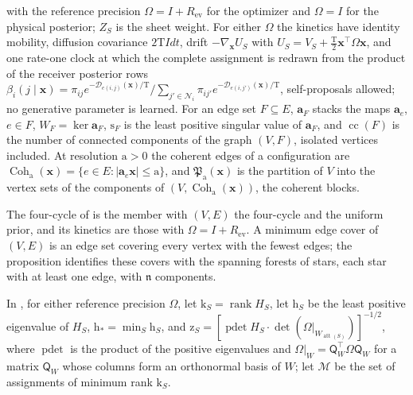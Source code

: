 with the reference precision \(\Omega=I+R_{\mathrm{ev}}\) for the optimizer
and \(\Omega=I\) for the physical posterior; \(Z_S\) is the sheet weight. For
either \(\Omega\) the kinetics have identity mobility, diffusion covariance
\(2\mathrm TI dt\), drift \(-\nabla_{\mathbf x}U_S\) with
\(U_S=V_S+\tfrac{\mathrm T}2\mathbf x^\top\Omega\mathbf x\), and one rate-one
clock at which the complete assignment is redrawn from the product of the
receiver posterior rows
\(\beta_i(j\mid\mathbf x)=\pi_{ij}e^{-\mathcal D_{e(i,j)}(\mathbf x)/\mathrm T}
\big/\allowbreak\sum_{j'\in\mathcal N_i}\pi_{ij'}e^{-\mathcal D_{e(i,j')}(\mathbf x)/\mathrm T}\),
self-proposals allowed; no generative parameter is learned. For an edge set
\(F\subseteq E\), \(\mathbf a_F\) stacks the maps \(\mathbf a_e\), \(e\in F\),
\(W_F=\ker\mathbf a_F\), \(\mathrm s_F\) is the least positive singular value
of \(\mathbf a_F\), and \(\operatorname{cc}(F)\) is the number of connected
components of the graph \((V,F)\), isolated vertices included. At resolution
\(\mathrm a>0\) the coherent edges of a configuration are
\(\operatorname{Coh}_{\mathrm a}(\mathbf x)=\{e\in E:|\mathbf a_e\mathbf x|\le\mathrm a\}\),
and \(\mathfrak P_{\mathrm a}(\mathbf x)\) is the partition of \(V\) into the
vertex sets of the components of \((V,\operatorname{Coh}_{\mathrm a}(\mathbf x))\),
the coherent blocks.

The four-cycle of  is the member with
\((V,E)\) the four-cycle and the uniform prior, and its kinetics are those with
\(\Omega=I+R_{\mathrm{ev}}\). A minimum edge cover of \((V,E)\) is an edge set
covering every vertex with the fewest edges; the proposition identifies these
covers with the spanning forests of stars, each star with at least one edge,
with \(\mathfrak n\) components.

In , for either reference precision
\(\Omega\), let \(\mathrm k_S=\operatorname{rank}H_S\), let \(\mathrm h_S\) be
the least positive eigenvalue of \(H_S\), \(\mathrm h_*=\min_S\mathrm h_S\),
and \(\mathrm z_S=[\operatorname{pdet}H_S\cdot\det(\Omega|_{W_{\operatorname{att}(S)}})]^{-1/2}\),
where \(\operatorname{pdet}\) is the product of the positive eigenvalues and
\(\Omega|_W=\mathsf Q_W^\top\Omega\mathsf Q_W\) for a matrix \(\mathsf Q_W\)
whose columns form an orthonormal basis of \(W\); let \(\mathcal M\) be the set
of assignments of minimum rank \(\mathrm k_S\).

